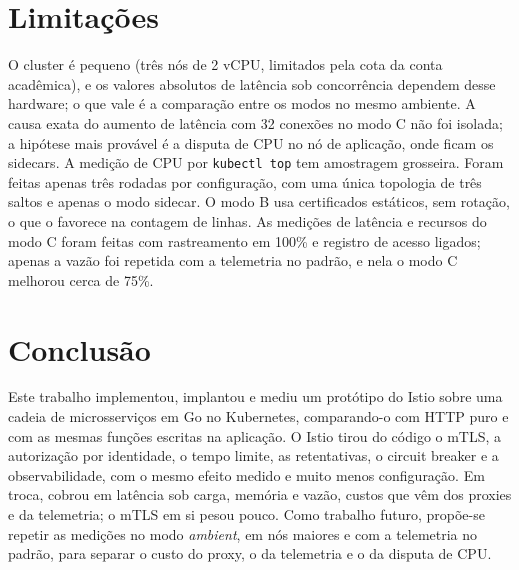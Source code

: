 \documentclass[12pt]{article}
\begin{document}
\section{Limitações}

O cluster é pequeno (três nós de 2 vCPU, limitados pela cota da conta
acadêmica), e os valores absolutos de latência sob concorrência dependem desse
hardware; o que vale é a comparação entre os modos no mesmo ambiente. A causa
exata do aumento de latência com 32 conexões no modo C não foi isolada; a
hipótese mais provável é a disputa de CPU no nó de aplicação, onde ficam os
sidecars. A medição de CPU por \texttt{kubectl top} tem amostragem grosseira.
Foram feitas apenas três rodadas por configuração, com uma única topologia de
três saltos e apenas o modo sidecar. O modo B usa certificados estáticos, sem
rotação, o que o favorece na contagem de linhas. As medições de latência e
recursos do modo C foram feitas com rastreamento em 100\% e registro de acesso
ligados; apenas a vazão foi repetida com a telemetria no padrão, e nela o modo
C melhorou cerca de 75\%.

\section{Conclusão}

Este trabalho implementou, implantou e mediu um protótipo do Istio sobre uma
cadeia de microsserviços em Go no Kubernetes, comparando-o com HTTP puro e com
as mesmas funções escritas na aplicação. O Istio tirou do código o mTLS, a
autorização por identidade, o tempo limite, as retentativas, o circuit breaker
e a observabilidade, com o mesmo efeito medido e muito menos configuração. Em
troca, cobrou em latência sob carga, memória e vazão, custos que vêm dos
proxies e da telemetria; o mTLS em si pesou pouco. Como trabalho futuro,
propõe-se repetir as medições no modo \emph{ambient}, em nós maiores e com a
telemetria no padrão, para separar o custo do proxy, o da telemetria e o da
disputa de CPU.



\end{document}
